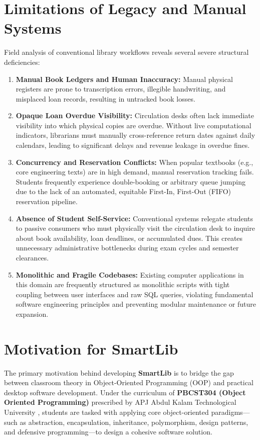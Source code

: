 \section{Limitations of Legacy and Manual Systems}
Field analysis of conventional library workflows reveals several severe structural deficiencies:
\begin{enumerate}
    \item \textbf{Manual Book Ledgers and Human Inaccuracy:} Manual physical registers are prone to transcription errors, illegible handwriting, and misplaced loan records, resulting in untracked book losses.
    \item \textbf{Opaque Loan Overdue Visibility:} Circulation desks often lack immediate visibility into which physical copies are overdue. Without live computational indicators, librarians must manually cross-reference return dates against daily calendars, leading to significant delays and revenue leakage in overdue fines.
    \item \textbf{Concurrency and Reservation Conflicts:} When popular textbooks (e.g., core engineering texts) are in high demand, manual reservation tracking fails. Students frequently experience double-booking or arbitrary queue jumping due to the lack of an automated, equitable First-In, First-Out (FIFO) reservation pipeline.
    \item \textbf{Absence of Student Self-Service:} Conventional systems relegate students to passive consumers who must physically visit the circulation desk to inquire about book availability, loan deadlines, or accumulated dues. This creates unnecessary administrative bottlenecks during exam cycles and semester clearances.
    \item \textbf{Monolithic and Fragile Codebases:} Existing computer applications in this domain are frequently structured as monolithic scripts with tight coupling between user interfaces and raw SQL queries, violating fundamental software engineering principles and preventing modular maintenance or future expansion.
\end{enumerate}

\section{Motivation for SmartLib}
The primary motivation behind developing \textbf{SmartLib} is to bridge the gap between classroom theory in Object-Oriented Programming (OOP) and practical desktop software development. Under the curriculum of \textbf{PBCST304 (Object Oriented Programming)} prescribed by APJ Abdul Kalam Technological University \cite{ktu2023curriculum}, students are tasked with applying core object-oriented paradigms---such as abstraction, encapsulation, inheritance, polymorphism, design patterns, and defensive programming---to design a cohesive software solution.

